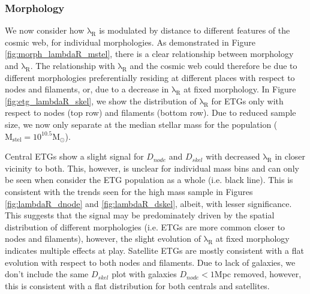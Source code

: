 \subsubsection{Morphology}
We now consider how $\mathrm{\lambda_R}$ is modulated by distance to different features of the cosmic web, for individual morphologies. As demonstrated in Figure \ref{fig:morph_lambdaR_mstel}, there is a clear relationship between morphology and $\mathrm{\lambda_R}$. The relationship with $\mathrm{\lambda_R}$ and the cosmic web could therefore be due to different morphologies preferentially residing at different places with respect to nodes and filaments, or, due to a decrease in $\mathrm{\lambda_R}$ at fixed morphology. In Figure \ref{fig:etg_lambdaR_skel}, we show the distribution of $\mathrm{\lambda_R}$ for ETGs only with respect to nodes (top row) and filaments (bottom row). Due to reduced sample size, we now only separate at the median stellar mass for the population ($\mathrm{M_{stel} = 10^{10.5}M_{\odot}}$). 

Central ETGs show a slight signal for $D_{node}$ and $D_{skel}$ with decreased $\mathrm{\lambda_R}$ in closer vicinity to both. This, however, is unclear for individual mass bins and can only be seen when consider the ETG population as a whole (i.e. black line). This is consistent with the trends seen for the high mass sample in Figures \ref{fig:lambdaR_dnode} and \ref{fig:lambdaR_dskel}, albeit, with lesser significance. This suggests that the signal may be predominately driven by the spatial distribution of different morphologies (i.e. ETGs are more common closer to nodes and filaments), however, the slight evolution of $\mathrm{\lambda_R}$ at fixed morphology indicates multiple effects at play. Satellite ETGs are mostly consistent with a flat evolution with respect to both nodes and filaments. Due to lack of galaxies, we don't include the same $D_{skel}$ plot with galaxies $D_{node} < 1$Mpc removed, however, this is consistent with a flat distribution for both centrals and satellites.

